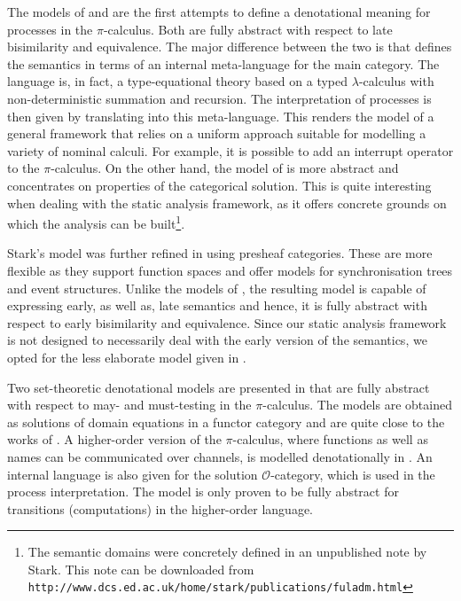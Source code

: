 \documentclass[10pt,a4paper,final,oneside,fleqn]{book}
\begin{document}
The models of \cite{fiore1} and \cite{stark1} are the first attempts to define a denotational meaning for processes in the $\pi$-calculus.  Both are fully abstract with respect to late bisimilarity and equivalence.  The major difference between the two is that \cite{fiore1} defines the semantics in terms of an internal meta-language for the main category.  The language is, in fact, a type-equational theory based on a typed $\lambda$-calculus with non-deterministic summation and recursion.  The interpretation of processes is then given by translating into this meta-language.  This renders the model of \cite{fiore1} a general framework that relies on a uniform approach suitable for modelling a variety of nominal calculi. For example, it is possible to add an interrupt operator to the $\pi$-calculus. On the other hand, the model of \cite{stark1} is more abstract and concentrates on properties of the categorical solution.  This is quite interesting when dealing with the static analysis framework, as it offers concrete grounds on which the analysis can be built\footnote{The semantic domains were concretely defined in an unpublished note by Stark.  This note can be downloaded from \texttt{http://www.dcs.ed.ac.uk/home/stark/publications/fuladm.html}}.

Stark's model was further refined in \cite{cattani1} using presheaf categories.  These are more flexible as they support function spaces and offer models for synchronisation trees and event structures.  Unlike the models of \cite{fiore1,stark1}, the resulting model is capable of expressing early, as well as, late semantics and hence, it is fully abstract with respect to early bisimilarity and equivalence.  Since our static analysis framework is not designed to necessarily deal with the early version of the semantics, we opted for the less elaborate model given in \cite{stark1}.

Two set-theoretic denotational models are presented in \cite{hennessy1} that are fully abstract with respect to may- and must-testing in the $\pi$-calculus.  The models are obtained as solutions of domain equations in a functor category and are quite close to the works of \cite{fiore1,stark1}.  A higher-order version of the $\pi$-calculus, where functions as well as names can be communicated over channels, is modelled denotationally in \cite{hartonas1}.  An internal language is also given for the solution $\mathcal{O}$-category, which is used in the process interpretation.  The model is only proven to be fully abstract for transitions (computations) in the higher-order language.
\end{document}
